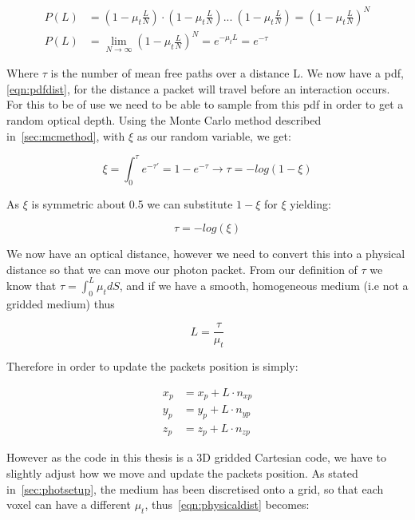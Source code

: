 \begin{align}
P(L) &= (1-\mu_t\frac{L}{N}) \cdot (1-\mu_t\frac{L}{N}) ...\ (1-\mu_t\frac{L}{N}) = (1-\mu_t\frac{L}{N})^N \\
P(L) &= \lim_{N \to \infty}(1-\mu_t\frac{L}{N})^N=e^{-\mu_tL}=e^{-\tau}\label{eqn:pdfdist}
\end{align}

Where $\tau$ is the number of mean free paths over a distance L. We now have a \gls{pdf}, \cref{eqn:pdfdist}, for the distance a packet will travel before an interaction occurs. For this to be of use we need to be able to sample from this \gls{pdf} in order to get a random optical depth. Using the Monte Carlo method described in~\cref{sec:mcmethod}, with $\xi$ as our random variable, we get:

\begin{equation}
\xi=\int_{0}^{\tau}e^{-\tau'}=1-e^{-\tau}\rightarrow \tau=-log(1-\xi)
\end{equation}

As $\xi$ is symmetric about 0.5 we can substitute $1-\xi$ for $\xi$ yielding:

\begin{equation}
\tau=-log(\xi)\label{eqn:taueqn}
\end{equation} 

We now have an optical distance, however we need to convert this into a physical distance so that we can move our photon packet. From our definition of $\tau$ we know that $\tau=\int_0^L\mu_tdS$, and if we have a smooth, homogeneous medium (i.e not a gridded medium) thus 

\begin{equation}
L=\frac{\tau}{\mu_t}\label{eqn:physicaldist}
\end{equation}

Therefore in order to update the packets position is simply:

\begin{align}
x_p &= x_p+L\cdot n_{xp}\label{eqn:update1}\\
y_p &= y_p+L\cdot n_{yp}\label{eqn:update2}\\
z_p &= z_p+L\cdot n_{zp}\label{eqn:update3}
\end{align}

However as the code in this thesis is a 3D gridded Cartesian code, we have to slightly adjust how we move and update the packets position. As stated in~\cref{sec:photsetup}, the medium has been discretised onto a grid, so that each voxel can have a different $\mu_t$, thus~\cref{eqn:physicaldist} becomes:

